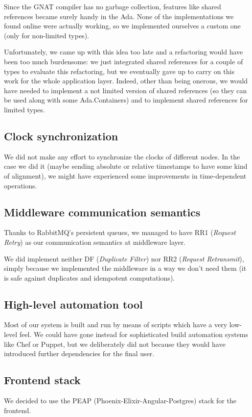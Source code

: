 Since the GNAT compiler has no garbage collection, features like shared references became
surely handy in the Ada. None of the implementations we found online were
actually working, so we implemented ourselves a custom one (only for non-limited
types).

Unfortunately, we came up with this idea too late and a refactoring would have
been too much burdensome: we just integrated shared references for a couple of
types to evaluate this refactoring, but we eventually gave up to carry on this
work for the whole application layer.
Indeed, other than being onerous, we would have needed to implement a not
limited version of shared references (so they can be used along with some
Ada.Containers) and to implement shared references for limited types.

\subsection{Clock synchronization}
We did not make any effort to synchronize the clocks of different nodes.
In the case we did it (maybe sending absolute or relative timestamps to have 
some kind of alignment), we might have experienced some improvements in
time-dependent operations.

\subsection{Middleware communication semantics}
Thanks to RabbitMQ's persistent queues, we managed to have RR1
(\textit{Request Retry}) as our communication semantics at middleware layer.

We did implement neither DF (\textit{Duplicate Filter}) nor RR2
(\textit{Request Retransmit}), simply because we implemented the middleware in
a way we don't need them (it is safe against duplicates and idempotent
computations).

\subsection{High-level automation tool}
Most of our system is built and run by means of scripts which have a very
low-level feel. We could have gone instead for sophisticated build automation
systems like Chef or Puppet, but we deliberately did not because they would
have introduced further dependencies for the final user.

\subsection{Frontend stack}
We decided to use the PEAP (Phoenix-Elixir-Angular-Postgres) stack for the
frontend.

